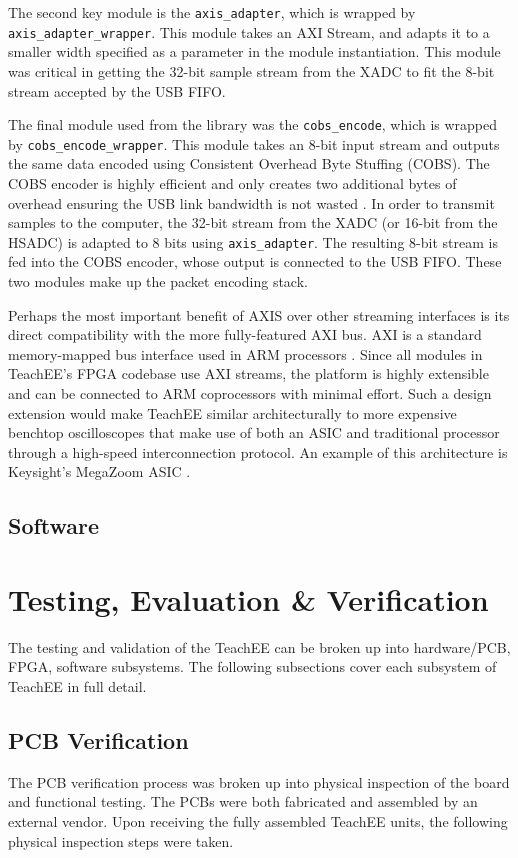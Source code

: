 \documentclass[letterpaper,11pt]{article}
\newcommand{\code}[1]{\texttt{#1}}
\begin{document}
The second key module is the \code{axis_adapter}, which is wrapped by
\code{axis_adapter_wrapper}. This module takes an AXI Stream, and adapts it to a
smaller width specified as a parameter in the module instantiation. This module
was critical in getting the 32-bit sample stream from the XADC to fit the 8-bit
stream accepted by the USB FIFO.

The final module used from the library was the \code{cobs_encode}, which is
wrapped by \code{cobs_encode_wrapper}. This module takes an 8-bit input stream
and outputs the same data encoded using Consistent Overhead Byte Stuffing
(COBS). The COBS encoder is highly efficient and only creates two additional
bytes of overhead ensuring the USB link bandwidth is not wasted \cite{cobs}.
In order to transmit samples to the computer, the 32-bit stream from the XADC
(or 16-bit from the HSADC) is adapted to 8 bits using \code{axis_adapter}. The
resulting 8-bit stream is fed into the COBS encoder, whose output is connected
to the USB FIFO. These two modules make up the packet encoding stack.

Perhaps the most important benefit of AXIS over other streaming interfaces is
its direct compatibility with the more fully-featured AXI bus. AXI is a standard
memory-mapped bus interface used in ARM processors \cite{axi_spec}. Since all
modules in TeachEE's FPGA codebase use AXI streams, the platform is highly
extensible and can be connected to ARM coprocessors with minimal effort. Such a
design extension would make TeachEE similar architecturally to more expensive
benchtop oscilloscopes that make use of both an ASIC and traditional processor
through a high-speed interconnection protocol. An example of this architecture
is Keysight's MegaZoom ASIC \cite{keysight_megazoom}.

\subsection{Software} %

\section{Testing, Evaluation \& Verification} \label{sec:testing}
The testing and validation of the TeachEE can be broken up into hardware/PCB,
FPGA, software subsystems. The following subsections cover each subsystem of
TeachEE in full detail.

\subsection{PCB Verification} %
The PCB verification process was broken up into physical inspection of the board
and functional testing. The PCBs were both fabricated and assembled by an
external vendor. Upon receiving the fully assembled TeachEE units, the following
physical inspection steps were taken.
\end{document}
